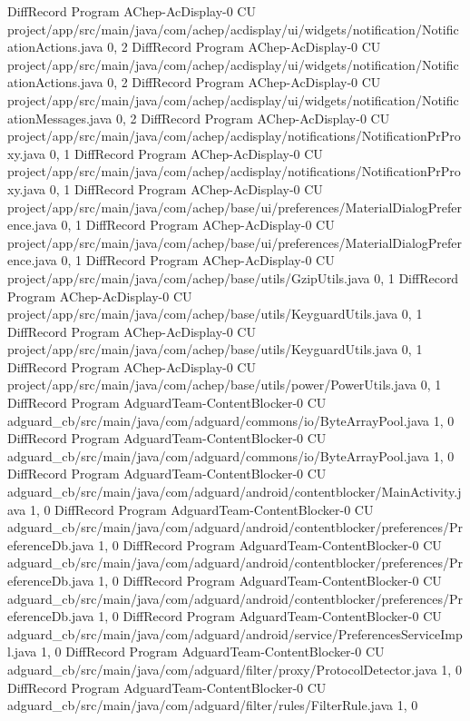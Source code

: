 DiffRecord Program AChep-AcDisplay-0 CU project/app/src/main/java/com/achep/acdisplay/ui/widgets/notification/NotificationActions.java  {0, 2}
DiffRecord Program AChep-AcDisplay-0 CU project/app/src/main/java/com/achep/acdisplay/ui/widgets/notification/NotificationActions.java  {0, 2}
DiffRecord Program AChep-AcDisplay-0 CU project/app/src/main/java/com/achep/acdisplay/ui/widgets/notification/NotificationMessages.java  {0, 2}
DiffRecord Program AChep-AcDisplay-0 CU project/app/src/main/java/com/achep/acdisplay/notifications/NotificationPrProxy.java  {0, 1}
DiffRecord Program AChep-AcDisplay-0 CU project/app/src/main/java/com/achep/acdisplay/notifications/NotificationPrProxy.java  {0, 1}
DiffRecord Program AChep-AcDisplay-0 CU project/app/src/main/java/com/achep/base/ui/preferences/MaterialDialogPreference.java  {0, 1}
DiffRecord Program AChep-AcDisplay-0 CU project/app/src/main/java/com/achep/base/ui/preferences/MaterialDialogPreference.java  {0, 1}
DiffRecord Program AChep-AcDisplay-0 CU project/app/src/main/java/com/achep/base/utils/GzipUtils.java  {0, 1}
DiffRecord Program AChep-AcDisplay-0 CU project/app/src/main/java/com/achep/base/utils/KeyguardUtils.java  {0, 1}
DiffRecord Program AChep-AcDisplay-0 CU project/app/src/main/java/com/achep/base/utils/KeyguardUtils.java  {0, 1}
DiffRecord Program AChep-AcDisplay-0 CU project/app/src/main/java/com/achep/base/utils/power/PowerUtils.java  {0, 1}
DiffRecord Program AdguardTeam-ContentBlocker-0 CU adguard_cb/src/main/java/com/adguard/commons/io/ByteArrayPool.java  {1, 0}
DiffRecord Program AdguardTeam-ContentBlocker-0 CU adguard_cb/src/main/java/com/adguard/commons/io/ByteArrayPool.java  {1, 0}
DiffRecord Program AdguardTeam-ContentBlocker-0 CU adguard_cb/src/main/java/com/adguard/android/contentblocker/MainActivity.java  {1, 0}
DiffRecord Program AdguardTeam-ContentBlocker-0 CU adguard_cb/src/main/java/com/adguard/android/contentblocker/preferences/PreferenceDb.java  {1, 0}
DiffRecord Program AdguardTeam-ContentBlocker-0 CU adguard_cb/src/main/java/com/adguard/android/contentblocker/preferences/PreferenceDb.java  {1, 0}
DiffRecord Program AdguardTeam-ContentBlocker-0 CU adguard_cb/src/main/java/com/adguard/android/contentblocker/preferences/PreferenceDb.java  {1, 0}
DiffRecord Program AdguardTeam-ContentBlocker-0 CU adguard_cb/src/main/java/com/adguard/android/service/PreferencesServiceImpl.java  {1, 0}
DiffRecord Program AdguardTeam-ContentBlocker-0 CU adguard_cb/src/main/java/com/adguard/filter/proxy/ProtocolDetector.java  {1, 0}
DiffRecord Program AdguardTeam-ContentBlocker-0 CU adguard_cb/src/main/java/com/adguard/filter/rules/FilterRule.java  {1, 0}
